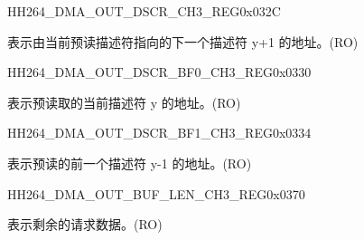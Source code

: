 \begin{register}{H}{H264\_DMA\_OUT\_DSCR\_CH3\_REG}{0x032C}\label{regdesc:H264DMAOUTDSCRCH3REG}
%
\regnewline%
\begin{regdesc}\begin{reglist}
\label{fielddesc:H264DMAOUTLINKDSCRCH3}\item [H264\_DMA\_OUTLINK\_DSCR\_CH3] 表示由当前预读描述符指向的下一个描述符 y+1 的地址。(RO)
\end{reglist}\end{regdesc}
\end{register}


\begin{register}{H}{H264\_DMA\_OUT\_DSCR\_BF0\_CH3\_REG}{0x0330}\label{regdesc:H264DMAOUTDSCRBF0CH3REG}
%
\regnewline%
\begin{regdesc}\begin{reglist}
\label{fielddesc:H264DMAOUTLINKDSCRBF0CH3}\item [H264\_DMA\_OUTLINK\_DSCR\_BF0\_CH3] 表示预读取的当前描述符 y 的地址。(RO)
\end{reglist}\end{regdesc}
\end{register}


\begin{register}{H}{H264\_DMA\_OUT\_DSCR\_BF1\_CH3\_REG}{0x0334}\label{regdesc:H264DMAOUTDSCRBF1CH3REG}
%
\regnewline%
\begin{regdesc}\begin{reglist}
\label{fielddesc:H264DMAOUTLINKDSCRBF1CH3}\item [H264\_DMA\_OUTLINK\_DSCR\_BF1\_CH3] 表示预读的前一个描述符 y-1 的地址。(RO)
\end{reglist}\end{regdesc}
\end{register}

\begin{register}{H}{H264\_DMA\_OUT\_BUF\_LEN\_CH3\_REG}{0x0370}\label{regdesc:H264DMAOUTBUFLENCH3REG}
%
%
\regnewline%
\begin{regdesc}\begin{reglist}
\label{fielddesc:H264DMAOUTCMDFIFOBUFLENHBCH3}\item [H264\_DMA\_OUT\_CMDFIFO\_BUF\_LEN\_HB\_CH3] 表示剩余的请求数据。(RO)\end{reglist}\end{regdesc}
\end{register}


